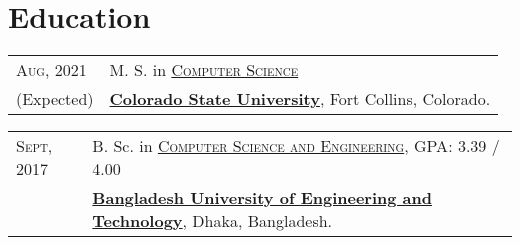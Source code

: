 \documentclass[a4paper,10pt]{article}
\begin{document}
\section{Education}
\begin{tabular}{p{1.8cm}|l} 

  \textsc{Aug}, 2021 & M. S. in \href{https://compsci.colostate.edu}{\textsc{Computer Science}} \\
 (Expected) & \href{https://www.colostate.edu/}{\textbf{Colorado State University}}, Fort Collins, Colorado.

\end{tabular}

\begin{tabular}{p{1.8cm}|l}
 \textsc{Sept}, 2017 & B. Sc. in \href{https://cse.buet.ac.bd/}{\textsc{Computer Science and Engineering}}, \normalsize \textsc{GPA}: 3.39 / 4.00 \\
 & \href{http://www.buet.ac.bd/}{\textbf{Bangladesh University of Engineering and Technology}}, Dhaka, Bangladesh.

\end{tabular}
\end{document}
